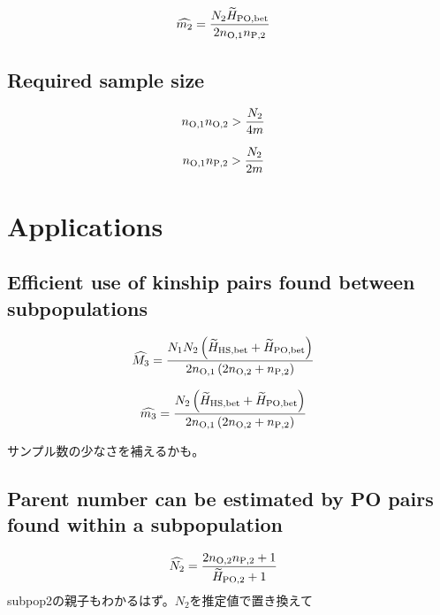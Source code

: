 \documentclass[AMA,STIX1COL]{WileyNJD-v2}
\begin{document}
\begin{align}
\widehat{m_2} &= \frac{N_{2} \widetilde{H}_{\rm PO,bet} } {2 n_{\rm O, 1} n_{\rm P, 2} }
\label{PO-4}
\end{align}

\subsection{Required sample size}

\begin{align}
n_{\rm O, 1} n_{\rm O, 2} &> \frac{ N_{2} } { 4m }
\label{RS-1}
\end{align}

\begin{align}
n_{\rm O, 1} n_{\rm P, 2} &> \frac{ N_{2} } { 2m }
\label{RS-2}
\end{align}

\section{Applications}\label{sec3}

\subsection{Efficient use of kinship pairs found between subpopulations}

\begin{align}
\widehat{M_3} &= \frac{ N_{1} N_{2} \left(\widetilde{H}_{\rm HS,bet} + \widetilde{H}_{\rm PO,bet}\right) } {2n_{\rm O, 1} \left(2 n_{\rm O, 2} + n_{\rm P, 2}\right) }
\label{AP-1}
\end{align}

\begin{align}
\widehat{m_3} &= \frac{ N_{2} \left(\widetilde{H}_{\rm HS,bet} + \widetilde{H}_{\rm PO,bet}\right) } {2n_{\rm O, 1} \left(2 n_{\rm O, 2} + n_{\rm P, 2}\right) }
\label{AP-2}
\end{align}

サンプル数の少なさを補えるかも。

\subsection{Parent number can be estimated by PO pairs found within a subpopulation}

\begin{align}
\widehat{N_2} &= \frac{ 2 n_{\rm O, 2} n_{\rm P, 2} + 1 }{\widetilde{H}_{\rm PO, 2} + 1} 
\label{AP-3}
\end{align}
subpop2の親子もわかるはず。$N_2$を推定値で置き換えて
\end{document}

